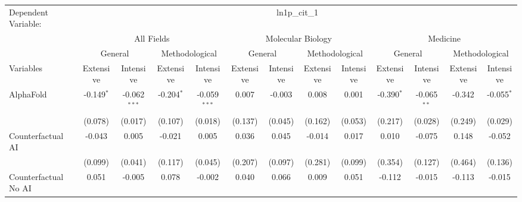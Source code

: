 \begingroup
\centering
\begin{tabular}{lcccccccccccc}
   \tabularnewline \midrule \midrule
   Dependent Variable: & \multicolumn{12}{c}{ln1p\_cit\_1}\\
 & \multicolumn{4}{c}{All Fields} & \multicolumn{4}{c}{Molecular Biology} & \multicolumn{4}{c}{Medicine} \\
\cmidrule(lr){2-5} \cmidrule(lr){6-9} \cmidrule(lr){10-13}
 & \multicolumn{2}{c}{General} & \multicolumn{2}{c}{Methodological} & \multicolumn{2}{c}{General} & \multicolumn{2}{c}{Methodological} & \multicolumn{2}{c}{General} & \multicolumn{2}{c}{Methodological} \\
\cmidrule(lr){2-3} \cmidrule(lr){4-5} \cmidrule(lr){6-7} \cmidrule(lr){8-9} \cmidrule(lr){10-11} \cmidrule(lr){12-13}
Variables & \multicolumn{1}{c}{Extensive} & \multicolumn{1}{c}{Intensive} & \multicolumn{1}{c}{Extensive} & \multicolumn{1}{c}{Intensive} & \multicolumn{1}{c}{Extensive} & \multicolumn{1}{c}{Intensive} & \multicolumn{1}{c}{Extensive} & \multicolumn{1}{c}{Intensive} & \multicolumn{1}{c}{Extensive} & \multicolumn{1}{c}{Intensive} & \multicolumn{1}{c}{Extensive} & \multicolumn{1}{c}{Intensive} \\
\cmidrule(lr){1-1}\cmidrule(lr){2-2} \cmidrule(lr){3-3} \cmidrule(lr){4-4} \cmidrule(lr){5-5} \cmidrule(lr){6-6} \cmidrule(lr){7-7} \cmidrule(lr){8-8} \cmidrule(lr){9-9} \cmidrule(lr){10-10} \cmidrule(lr){11-11} \cmidrule(lr){12-12} \cmidrule(lr){13-13}
   AlphaFold                                & -0.149$^{*}$ & -0.062$^{***}$ & -0.204$^{*}$ & -0.059$^{***}$ & 0.007   & -0.003        & 0.008   & 0.001         & -0.390$^{*}$ & -0.065$^{**}$ & -0.342  & -0.055$^{*}$\\   
                                            & (0.078)      & (0.017)        & (0.107)      & (0.018)        & (0.137) & (0.045)       & (0.162) & (0.053)       & (0.217)      & (0.028)       & (0.249) & (0.029)\\   
   Counterfactual AI                        & -0.043       & 0.005          & -0.021       & 0.005          & 0.036   & 0.045         & -0.014  & 0.017         & 0.010        & -0.075        & 0.148   & -0.052\\   
                                            & (0.099)      & (0.041)        & (0.117)      & (0.045)        & (0.207) & (0.097)       & (0.281) & (0.099)       & (0.354)      & (0.127)       & (0.464) & (0.136)\\   
   Counterfactual No AI                     & 0.051        & -0.005         & 0.078        & -0.002         & 0.040   & 0.066         & 0.009   & 0.051         & -0.112       & -0.015        & -0.113  & -0.015\\   

\end{tabular}
